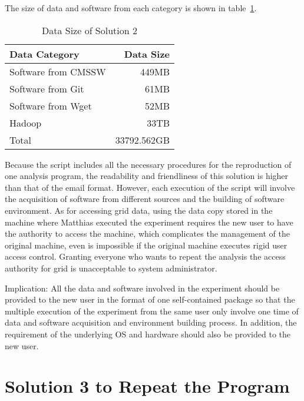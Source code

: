 \documentclass{acm_proc_article-sp}
\begin{document}
The size of data and software from each category is shown in table~\ref{table:datasize-2nd}.

\begin{table}
    \centering
    \begin{tabular}{|l|r|}
    \hline
    Data Category & Data Size \\ \hline
    Software from CMSSW & 449MB \\ \hline
    Software from Git & 61MB \\ \hline
    Software from Wget & 52MB \\ \hline
    Hadoop & 33TB \\ \hline
    Total & 33792.562GB \\ \hline
    \end{tabular}
    \caption{Data Size of Solution 2}
    \label{table:datasize-2nd}
\end{table}

Because the script includes all the necessary procedures for the reproduction of one analysis program, the readability and friendliness of this solution is higher than that of the email format. However, each execution of the script will involve the acquisition of software from different sources and the building of software environment. As for accessing grid data, using the data copy stored in the machine where Matthias executed the experiment requires the new user to have the authority to access the machine, which complicates the management of the original machine, even is impossible if the original machine executes rigid user access control. Granting everyone who wants to repeat the analysis the access authority for grid is unacceptable to system administrator. 

Implication: All the data and software involved in the experiment should be provided to the new user in the format of one self-contained package so that the multiple execution of the experiment from the same user only involve one time of data and software acquisition and environment building process. In addition, the requirement of the underlying OS and hardware should also be provided to the new user.

\section{Solution 3 to Repeat the Program}
\end{document}
